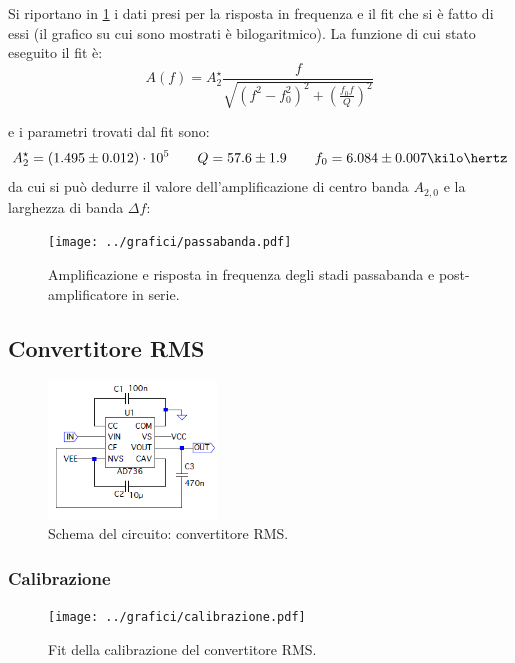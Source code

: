 \documentclass[a4paper,10pt]{article}
\begin{document}
Si riportano in \cref{fig:bandpass} i dati presi per la risposta in frequenza e il fit che si è fatto di essi (il grafico su cui sono mostrati è bilogaritmico).
La funzione di cui stato eseguito il fit è:
\[ A(f) = A_2^\star \frac{f}{\sqrt{(f^2-f_0^2)^2 + \left(\frac{f_0 f}{Q}\right)^2}} \]

e i parametri trovati dal fit sono:
\[ A_2^\star=(1.495 \pm 0.012)\cdot10^5 \qquad Q=57.6 \pm 1.9 \qquad f_0=6.084 \pm 0.007 \kilo\hertz  \]
da cui si può dedurre il valore dell'amplificazione di centro banda $ A_{2,0} $ e la larghezza di banda $ \Delta f $:

\begin{figure}[H]
	\centering
	\texttt{[image: ../grafici/passabanda.pdf]}
	\vspace*{10pt}
	\caption{Amplificazione e risposta in frequenza degli stadi passabanda e post-amplificatore in serie.}
	\label{fig:bandpass}
\end{figure}

\subsection{Convertitore RMS}

\begin{figure}
	\vspace{-10pt}
	\centering
	\includegraphics[width=0.4\textwidth]{../grafici/RMSconverter.png}
	\vspace{-12pt}
	\caption{Schema del circuito: convertitore RMS.}
	\label{fig:powamp}
	\vspace{-6pt}
\end{figure}



\subsubsection*{Calibrazione}



\begin{figure}[H]
	\centering
	\texttt{[image: ../grafici/calibrazione.pdf]}
	\vspace*{10pt}
	\caption{Fit della calibrazione del convertitore RMS.}
	\label{fig:blocks}
\end{figure}
\end{document}
